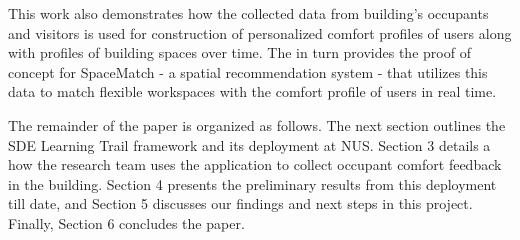 This work also demonstrates how the collected data from building's occupants and visitors is used for construction of personalized comfort profiles of users along with profiles of building spaces over time. The  in turn provides the proof of concept for SpaceMatch - a spatial recommendation system - that utilizes this data to match flexible workspaces with the comfort profile of users in real time.

The remainder of the paper is organized as follows. The next section outlines the SDE Learning Trail framework and its deployment at NUS. Section 3 details a how the research team uses the application to collect occupant comfort feedback in the building. Section 4 presents the preliminary results from this deployment till date, and Section 5 discusses our findings and next steps in this project. Finally, Section 6 concludes the paper. 







